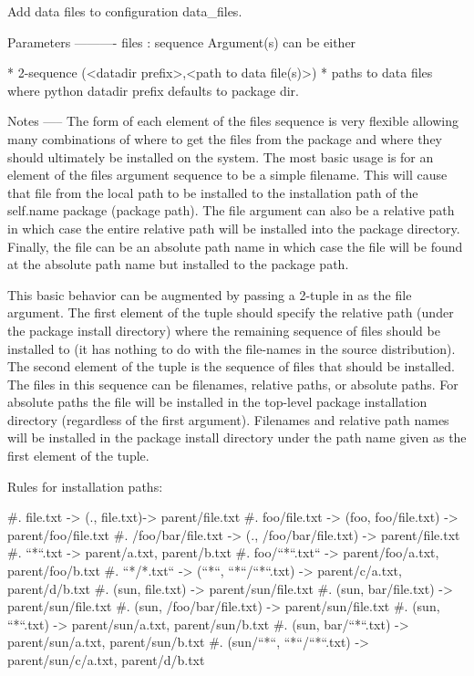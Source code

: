 \begin{DoxyVerb}Add data files to configuration data_files.

Parameters
----------
files : sequence
    Argument(s) can be either

* 2-sequence (<datadir prefix>,<path to data file(s)>)
* paths to data files where python datadir prefix defaults
  to package dir.

Notes
-----
The form of each element of the files sequence is very flexible
allowing many combinations of where to get the files from the package
and where they should ultimately be installed on the system. The most
basic usage is for an element of the files argument sequence to be a
simple filename. This will cause that file from the local path to be
installed to the installation path of the self.name package (package
path). The file argument can also be a relative path in which case the
entire relative path will be installed into the package directory.
Finally, the file can be an absolute path name in which case the file
will be found at the absolute path name but installed to the package
path.

This basic behavior can be augmented by passing a 2-tuple in as the
file argument. The first element of the tuple should specify the
relative path (under the package install directory) where the
remaining sequence of files should be installed to (it has nothing to
do with the file-names in the source distribution). The second element
of the tuple is the sequence of files that should be installed. The
files in this sequence can be filenames, relative paths, or absolute
paths. For absolute paths the file will be installed in the top-level
package installation directory (regardless of the first argument).
Filenames and relative path names will be installed in the package
install directory under the path name given as the first element of
the tuple.

Rules for installation paths:

  #. file.txt -> (., file.txt)-> parent/file.txt
  #. foo/file.txt -> (foo, foo/file.txt) -> parent/foo/file.txt
  #. /foo/bar/file.txt -> (., /foo/bar/file.txt) -> parent/file.txt
  #. ``*``.txt -> parent/a.txt, parent/b.txt
  #. foo/``*``.txt`` -> parent/foo/a.txt, parent/foo/b.txt
  #. ``*/*.txt`` -> (``*``, ``*``/``*``.txt) -> parent/c/a.txt, parent/d/b.txt
  #. (sun, file.txt) -> parent/sun/file.txt
  #. (sun, bar/file.txt) -> parent/sun/file.txt
  #. (sun, /foo/bar/file.txt) -> parent/sun/file.txt
  #. (sun, ``*``.txt) -> parent/sun/a.txt, parent/sun/b.txt
  #. (sun, bar/``*``.txt) -> parent/sun/a.txt, parent/sun/b.txt
  #. (sun/``*``, ``*``/``*``.txt) -> parent/sun/c/a.txt, parent/d/b.txt


\end{DoxyVerb}
